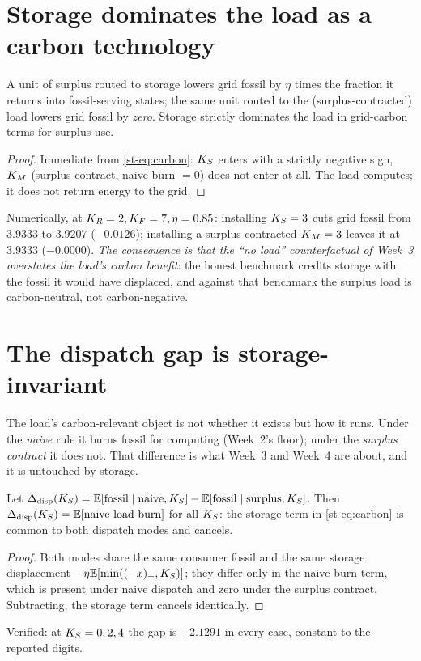 \section{Storage dominates the load as a carbon technology}
\begin{proposition}\label{st-prop:carbon}
A unit of surplus routed to storage lowers grid fossil by $\eta$ times the fraction it returns
into fossil-serving states; the same unit routed to the (surplus-contracted) load lowers grid
fossil by \emph{zero}. Storage strictly dominates the load in grid-carbon terms for surplus
use.
\end{proposition}
\begin{proof}
Immediate from \eqref{st-eq:carbon}: $K_S$ enters with a strictly negative sign, $K_M$ (surplus
contract, naive burn $=0$) does not enter at all. The load computes; it does not return energy
to the grid.
\end{proof}
Numerically, at $K_R=2,K_F=7,\eta=0.85$: installing $K_S=3$ cuts grid fossil from $3.9333$ to
$3.9207$ ($-0.0126$); installing a surplus-contracted $K_M=3$ leaves it at $3.9333$
($-0.0000$). \emph{The consequence is that the ``no load'' counterfactual of Week~3 overstates
the load's carbon benefit}: the honest benchmark credits storage with the fossil it would have
displaced, and against that benchmark the surplus load is carbon-neutral, not carbon-negative.

\section{The dispatch gap is storage-invariant}
The load's carbon-relevant object is not whether it exists but how it runs. Under the
\emph{naive} rule it burns fossil for computing (Week~2's floor); under the \emph{surplus
contract} it does not. That difference is what Week~3 and Week~4 are about, and it is
untouched by storage.
\begin{proposition}\label{st-prop:invariant}
Let $\Delta_{\mathrm{disp}}(K_S)=\mathbb{E}[\text{fossil}\mid\text{naive},K_S]-\mathbb{E}[\text{fossil}\mid\text{surplus},K_S]$.
Then $\Delta_{\mathrm{disp}}(K_S)=\mathbb{E}[\text{naive load burn}]$ for all $K_S$: the storage term in
\eqref{st-eq:carbon} is common to both dispatch modes and cancels.
\end{proposition}
\begin{proof}
Both modes share the same consumer fossil and the same storage displacement $-\eta\mathbb{E}[\min((-x)_+,K_S)]$;
they differ only in the naive burn term, which is present under naive dispatch and zero under
the surplus contract. Subtracting, the storage term cancels identically.
\end{proof}
Verified: at $K_S=0,2,4$ the gap is $+2.1291$ in every case, constant to the reported digits.

